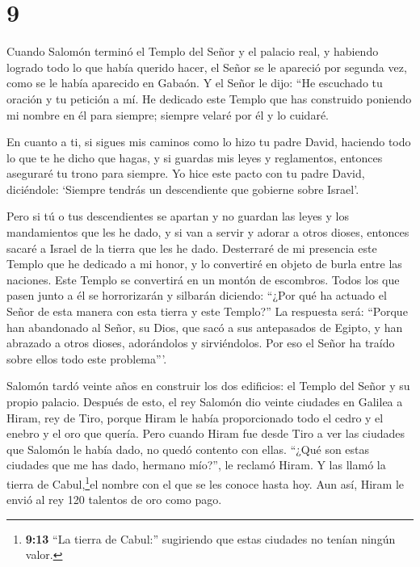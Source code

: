 \hypertarget{section-8}{%
\section{9}\label{section-8}}

 Cuando Salomón terminó el Templo del Señor y el palacio
real, y habiendo logrado todo lo que había querido hacer, 
el Señor se le apareció por segunda vez, como se le había aparecido en
Gabaón.  Y el Señor le dijo: ``He escuchado tu oración y tu
petición a mí. He dedicado este Templo que has construido poniendo mi
nombre en él para siempre; siempre velaré por él y lo cuidaré.

 En cuanto a ti, si sigues mis caminos como lo hizo tu padre
David, haciendo todo lo que te he dicho que hagas, y si guardas mis
leyes y reglamentos,  entonces aseguraré tu trono para
siempre. Yo hice este pacto con tu padre David, diciéndole: `Siempre
tendrás un descendiente que gobierne sobre Israel'.

 Pero si tú o tus descendientes se apartan y no guardan las
leyes y los mandamientos que les he dado, y si van a servir y adorar a
otros dioses,  entonces sacaré a Israel de la tierra que les
he dado. Desterraré de mi presencia este Templo que he dedicado a mi
honor, y lo convertiré en objeto de burla entre las naciones.
 Este Templo se convertirá en un montón de escombros. Todos
los que pasen junto a él se horrorizarán y silbarán diciendo: ``¿Por qué
ha actuado el Señor de esta manera con esta tierra y este Templo?''
 La respuesta será: ``Porque han abandonado al Señor, su
Dios, que sacó a sus antepasados de Egipto, y han abrazado a otros
dioses, adorándolos y sirviéndolos. Por eso el Señor ha traído sobre
ellos todo este problema'''.

 Salomón tardó veinte años en construir los dos edificios:
el Templo del Señor y su propio palacio. Después de esto, 
el rey Salomón dio veinte ciudades en Galilea a Hiram, rey de Tiro,
porque Hiram le había proporcionado todo el cedro y el enebro y el oro
que quería.  Pero cuando Hiram fue desde Tiro a ver las
ciudades que Salomón le había dado, no quedó contento con ellas.
 ``¿Qué son estas ciudades que me has dado, hermano mío?'',
le reclamó Hiram. Y las llamó la tierra de Cabul,\footnote{\textbf{9:13}
  ``La tierra de Cabul:'' sugiriendo que estas ciudades no tenían ningún
  valor.}el nombre con el que se les conoce hasta hoy.  Aun
así, Hiram le envió al rey 120 talentos de oro como pago.

